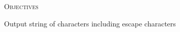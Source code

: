\textsc{Objectives}
 \begin{myenum}
 \li Output string of characters including escape characters
 \end{myenum}
\mbox{}\\
